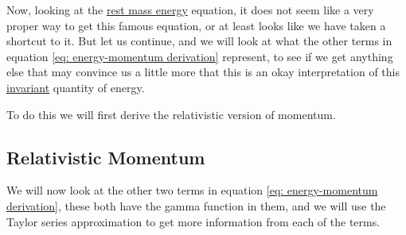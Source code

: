 Now, looking at the \hyperlink{def-rest-mass-energy}{rest mass energy} equation, it does not seem like a very proper way to get this famous equation, or at least looks like we have taken a shortcut to it.
But let us continue, and we will look at what the other terms in equation \eqref{eq: energy-momentum derivation} represent, to see if we get anything else that may convince us a little more that this is an okay interpretation of this \hyperlink{def-lorentz-invariant}{invariant} quantity of energy.

To do this we will first derive the relativistic version of momentum.

\subsection{Relativistic Momentum}\label{subsect: Relativistic Momentum}

We will now look at the other two terms in equation \eqref{eq: energy-momentum derivation}, these both have the gamma function in them, and we will use the Taylor series approximation to get more information from each of the terms.

